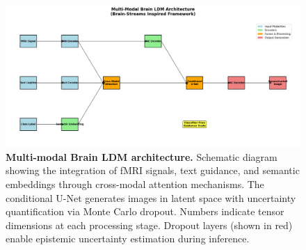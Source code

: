 \begin{figure}[htbp]
\centering
\includegraphics[width=\textwidth]{../figures/Fig4_architecture.png}
\caption{\textbf{Multi-modal Brain LDM architecture.} Schematic diagram showing the integration of fMRI signals, text guidance, and semantic embeddings through cross-modal attention mechanisms. The conditional U-Net generates images in latent space with uncertainty quantification via Monte Carlo dropout. Numbers indicate tensor dimensions at each processing stage. Dropout layers (shown in red) enable epistemic uncertainty estimation during inference.}
\label{fig:architecture}
\end{figure}
